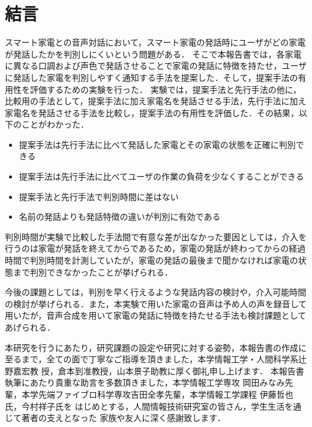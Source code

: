 \documentclass[a4j,12pt,twoside]{jreport}
\begin{document}
\chapter{結言} 
スマート家電との音声対話において，スマート家電の発話時にユーザがどの家電が発話したかを判別しにくいという問題がある．
そこで本報告書では，各家電に異なる口調および声色で発話させることで家電の発話に特徴を持たせ，ユーザに発話した家電を判別しやすく通知する手法を提案した．そして，提案手法の有用性を評価するための実験を行った．
実験では，提案手法と先行手法の他に，比較用の手法として，提案手法に加え家電名を発話させる手法，先行手法に加え家電名を発話させる手法を比較し，提案手法の有用性を評価した．その結果，以下のことがわかった．
\begin{itemize}
	\item 提案手法は先行手法に比べて発話した家電とその家電の状態を正確に判別できる
	\item 提案手法は先行手法に比べてユーザの作業の負荷を少なくすることができる
	\item 提案手法と先行手法で判別時間に差はない
	\item 名前の発話よりも発話特徴の違いが判別に有効である
\end{itemize}
判別時間が実験で比較した手法間で有意な差が出なかった要因としては，介入を行うのは家電が発話を終えてからであるため，家電の発話が終わってからの経過時間で判別時間を計測していたが，家電の発話の最後まで聞かなければ家電の状態まで判別できなかったことが挙げられる．

今後の課題としては，判別を早く行えるような発話内容の検討や，介入可能時間の検討が挙げられる．また，本実験で用いた家電の音声は予め人の声を録音して用いたが，音声合成を用いて家電の発話に特徴を持たせる手法も検討課題としてあげられる．

\acknowledgement %
本研究を行うにあたり，研究課題の設定や研究に対する姿勢，本報告書の作成に
至るまで，全ての面で丁寧なご指導を頂きました，本学情報工学・人間科学系辻野嘉宏教
授，倉本到准教授，山本景子助教に厚く御礼申し上げます．
本報告書執筆にあたり貴重な助言を多数頂きました，本学情報工学専攻
岡田みなみ先輩，本学先端ファイブロ科学専攻吉田全孝先輩，本学情報工学課程 伊藤哲也氏，今村祥子氏を
はじめとする，人間情報技術研究室の皆さん，学生生活を通じて著者の支えとなった
家族や友人に深く感謝致します．
\end{document}
